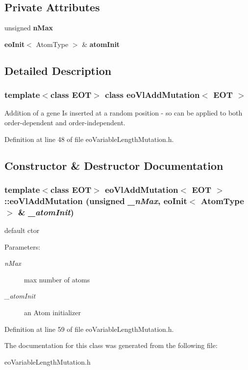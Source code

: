 \subsection*{Private Attributes}
\begin{CompactItemize}
\item 
unsigned {\bf n\-Max}\label{classeo_vl_add_mutation_r0}

\item 
{\bf eo\-Init}$<$ Atom\-Type $>$ \& {\bf atom\-Init}\label{classeo_vl_add_mutation_r1}

\end{CompactItemize}


\subsection{Detailed Description}
\subsubsection*{template$<$class EOT$>$ class eo\-Vl\-Add\-Mutation$<$ EOT $>$}

Addition of a gene Is inserted at a random position - so can be applied to both order-dependent and order-independent. 



Definition at line 48 of file eo\-Variable\-Length\-Mutation.h.

\subsection{Constructor \& Destructor Documentation}
\subsubsection{\setlength{\rightskip}{0pt plus 5cm}template$<$class EOT$>$ {\bf eo\-Vl\-Add\-Mutation}$<$ {\bf EOT} $>$::{\bf eo\-Vl\-Add\-Mutation} (unsigned {\em \_\-n\-Max}, {\bf eo\-Init}$<$ Atom\-Type $>$ \& {\em \_\-atom\-Init})\hspace{0.3cm}{\tt  [inline]}}\label{classeo_vl_add_mutation_a0}


default ctor 

\begin{Desc}
\item[Parameters:]
\begin{description}
\item[{\em n\-Max}]max number of atoms \item[{\em \_\-atom\-Init}]an Atom initializer \end{description}
\end{Desc}


Definition at line 59 of file eo\-Variable\-Length\-Mutation.h.

The documentation for this class was generated from the following file:\begin{CompactItemize}
\item 
eo\-Variable\-Length\-Mutation.h\end{CompactItemize}
